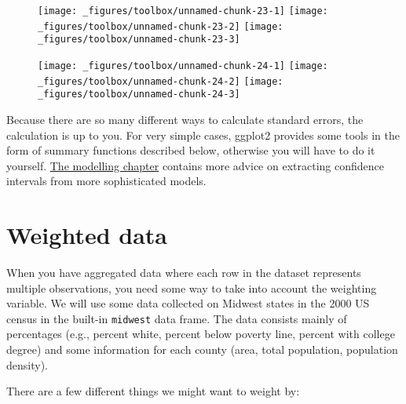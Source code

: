\begin{figure}[H]
  \texttt{[image: \_figures/toolbox/unnamed-chunk-23-1]}%
  \texttt{[image: \_figures/toolbox/unnamed-chunk-23-2]}%
  \texttt{[image: \_figures/toolbox/unnamed-chunk-23-3]}
\end{figure}

\begin{Shaded}
\begin{Highlighting}[]
\OperatorTok{+}\StringTok{ }\NormalTok{()}
\OperatorTok{+}\StringTok{ }\NormalTok{()}
\OperatorTok{+}\StringTok{ }\NormalTok{()}
\end{Highlighting}
\end{Shaded}

\begin{figure}[H]
  \texttt{[image: \_figures/toolbox/unnamed-chunk-24-1]}%
  \texttt{[image: \_figures/toolbox/unnamed-chunk-24-2]}%
  \texttt{[image: \_figures/toolbox/unnamed-chunk-24-3]}
\end{figure}

Because there are so many different ways to calculate standard errors,
the calculation is up to you.  For very simple
cases, ggplot2 provides some tools in the form of summary functions
described below, otherwise you will have to do it yourself.
\protect\hyperlink{cha:modelling}{The modelling chapter} contains more
advice on extracting confidence intervals from more sophisticated
models.

\hypertarget{sec:weighting}{%
\section{Weighted data}\label{sec:weighting}}

When you have aggregated data where each row in the dataset represents
multiple observations, you need some way to take into account the
weighting variable. We will use some data collected on Midwest states in
the 2000 US census in the built-in \texttt{midwest} data frame. The data
consists mainly of percentages (e.g., percent white, percent below
poverty line, percent with college degree) and some information for each
county (area, total population, population density). 

There are a few different things we might want to weight by:

